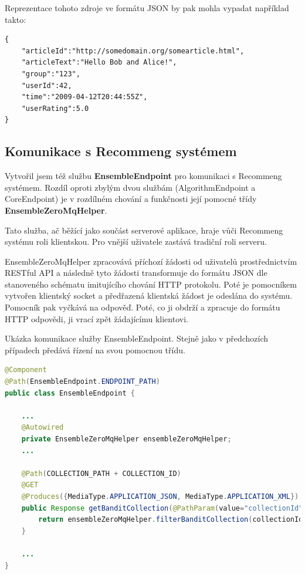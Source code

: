 \documentclass[thesis=M,czech]{FITthesis}[2014/05/07]
\begin{document}
Reprezentace tohoto zdroje ve formátu JSON by pak mohla vypadat například takto:

\begin{lstlisting}
{
    "articleId":"http://somedomain.org/somearticle.html",
    "articleText":"Hello Bob and Alice!",
    "group":"123",
    "userId":42,
    "time":"2009-04-12T20:44:55Z",
    "userRating":5.0
}
\end{lstlisting}

\subsection{Komunikace s Recommeng systémem}
\label{sec:restrec}
Vytvořil jsem též službu \textbf{EnsembleEndpoint} pro komunikaci s Recommeng systémem. Rozdíl oproti zbylým dvou službám (AlgorithmEndpoint a CoreEndpoint) je v rozdílném chování a funkčnosti její pomocné třídy \textbf{EnsembleZeroMqHelper}.

Tato služba, ač běžící jako součást serverové aplikace, hraje vůči Recommeng systému roli klientskou. Pro vnější uživatele zastává tradiční roli serveru.

EnsembleZeroMqHelper zpracovává příchozí žádosti od uživatelů prostřednictvím RESTful API a následně tyto žádosti transformuje do formátu JSON dle stanoveného schématu imitujícího chování HTTP protokolu. Poté je pomocníkem vytvořen klientský socket a předřazená klientská žádost je odeslána do systému. Pomocník pak vyčkává na odpověď. Poté, co ji obdrží a zpracuje do formátu HTTP odpovědi, ji vrací zpět žádajícímu klientovi. 

Ukázka komunikace služby EnsembleEndpoint. Stejně jako v předchozích případech předává řízení na svou pomocnou třídu.

\begin{lstlisting}[language=java]
@Component
@Path(EnsembleEndpoint.ENDPOINT_PATH)
public class EnsembleEndpoint {
    
    ...
    @Autowired
    private EnsembleZeroMqHelper ensembleZeroMqHelper;
    ...
	
    @Path(COLLECTION_PATH + COLLECTION_ID)
    @GET   
    @Produces({MediaType.APPLICATION_JSON, MediaType.APPLICATION_XML})
    public Response getBanditCollection(@PathParam(value="collectionId") String collectionId, @QueryParam(value = "filter") String filter) {
        return ensembleZeroMqHelper.filterBanditCollection(collectionId, filter);
    }
    
    ...
}
\end{lstlisting}
\end{document}
